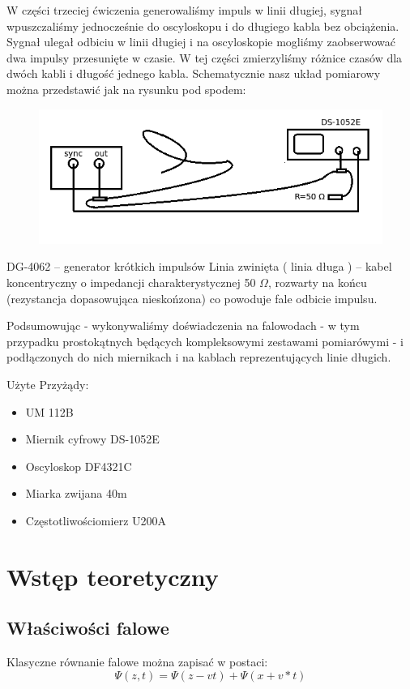 \documentclass[a4paper,11pt]{article}
\begin{document}
W części trzeciej ćwiczenia generowaliśmy impuls w linii długiej, sygnał wpuszczaliśmy jednocześnie do oscyloskopu i do długiego kabla bez obciążenia. Sygnał ulegał odbiciu w linii długiej i na oscyloskopie mogliśmy zaobserwować dwa impulsy przesunięte w czasie. W tej części zmierzyliśmy różnice czasów dla dwóch kabli i długość jednego kabla. Schematycznie nasz układ pomiarowy można przedstawić jak na rysunku pod spodem: 

\begin{figure} [H]
  \begin{center}
    \includegraphics{Edlugie.png}
  \end{center}
\end{figure}

DG-4062 – generator krótkich impulsów
Linia zwinięta ( linia długa ) – kabel koncentryczny o impedancji charakterystycznej 50 $\Omega$, rozwarty na końcu (rezystancja dopasowująca nieskońzona) co powoduje fale odbicie impulsu.

Podsumowując - wykonywaliśmy doświadczenia na falowodach - w tym przypadku prostokątnych będących kompleksowymi zestawami pomiarówymi - i podłączonych do nich miernikach i na kablach reprezentujących linie długich.

Użyte Przyżądy:
\begin{itemize}
  \item UM 112B
  \item Miernik cyfrowy DS-1052E
  \item Oscyloskop DF4321C
  \item Miarka zwijana 40m
  \item Częstotliwościomierz U200A
\end{itemize}


\section{Wstęp teoretyczny}
\subsection{Właściwości falowe}
Klasyczne równanie falowe można zapisać w postaci:
\[ \Psi (z, t) = \Psi (z-vt)+\Psi (x+v*t) \]
\end{document}
